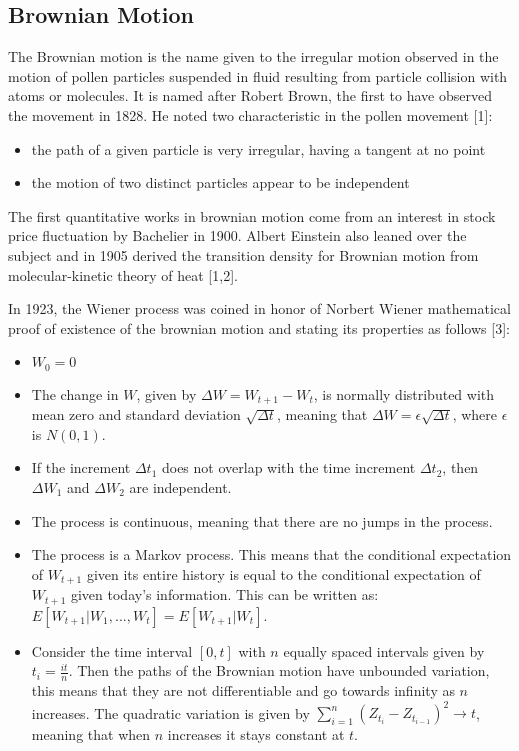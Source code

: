 \documentclass[12pt,twoside]{reedthesis}
\theoremstyle{definition}
\theoremstyle{definition}
\theoremstyle{remark}
\begin{document}
  \subsection{Brownian Motion}\label{brownian-motion}
  
  The Brownian motion is the name given to the irregular motion observed
  in the motion of pollen particles suspended in fluid resulting from
  particle collision with atoms or molecules. It is named after Robert
  Brown, the first to have observed the movement in 1828. He noted two
  characteristic in the pollen movement {[}1{]}:
  \begin{itemize}
  \item
    the path of a given particle is very irregular, having a tangent at no
    point
  \item
    the motion of two distinct particles appear to be independent
  \end{itemize}
  The first quantitative works in brownian motion come from an interest in
  stock price fluctuation by Bachelier in 1900. Albert Einstein also
  leaned over the subject and in 1905 derived the transition density for
  Brownian motion from molecular-kinetic theory of heat {[}1,2{]}.
  
  In 1923, the Wiener process was coined in honor of Norbert Wiener
  mathematical proof of existence of the brownian motion and stating its
  properties as follows {[}3{]}:
  \begin{itemize}
  \item
    \(W_{0}=0\)
  \item
    The change in \(W\), given by \(\Delta W = W_{t+1}-W_{t}\), is
    normally distributed with mean zero and standard deviation
    \(\sqrt{\Delta t}\), meaning that
    \(\Delta W = \epsilon\sqrt{\Delta t}\), where \(\epsilon\) is
    \(N(0,1)\).
  \item
    If the increment \(\Delta t_1\) does not overlap with the time
    increment \(\Delta t_2\), then \(\Delta W_1\) and \(\Delta W_2\) are
    independent.
  \item
    The process is continuous, meaning that there are no jumps in the
    process.
  \item
    The process is a Markov process. This means that the conditional
    expectation of \(W_{t+1}\) given its entire history is equal to the
    conditional expectation of \(W_{t+1}\) given today's information. This
    can be written as: \(E[W_{t+1}|W_1, ..., W_t] = E[W_{t+1}|W_t]\).
  \item
    Consider the time interval \([0,t]\) with \(n\) equally spaced
    intervals given by \(t_i = \frac{it}{n}\). Then the paths of the
    Brownian motion have unbounded variation, this means that they are not
    differentiable and go towards infinity as \(n\) increases. The
    quadratic variation is given by
    \(\sum_{i=1}^{n}{(Z_{t_i}-Z_{t_{i-1}})^2} \rightarrow t\), meaning
    that when \(n\) increases it stays constant at \(t\).
  \end{itemize}
\end{document}
